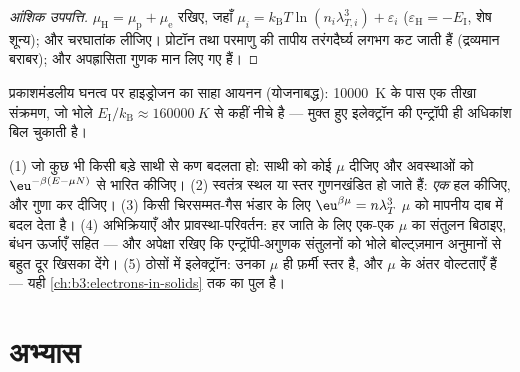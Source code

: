 \begin{proof}[आंशिक उपपत्ति]
$\mu_{\text{H}} = \mu_{\text{p}} + \mu_{\text{e}}$ रखिए, जहाँ $\mu_i
= k_{\text{B}}T\ln(n_i\lambda_{T,i}^3) + \varepsilon_i$
($\varepsilon_{\text{H}} = -E_{\text{I}}$, शेष शून्य); और
चरघातांक लीजिए। प्रोटॉन तथा परमाणु की तापीय तरंगदैर्घ्य लगभग
कट जाती हैं (द्रव्यमान बराबर); और अपह्रासिता गुणक मान लिए गए हैं।
\end{proof}

\begin{omfigure}

{\small प्रकाशमंडलीय घनत्व पर हाइड्रोजन का साहा आयनन
(योजनाबद्ध): \qty{10000}{K} के पास एक तीखा संक्रमण, जो भोले
$E_{\text{I}}/k_{\text{B}} \approx \qty{160000}{K}$ से कहीं नीचे है
--- मुक्त हुए इलेक्ट्रॉन की एन्ट्रॉपी ही अधिकांश बिल चुकाती है।}
\end{omfigure}

\begin{method}[वृहत्-विहित कारीगरी]\label{met:b3:grand-canonical:method}
(1) जो कुछ भी किसी बड़े साथी से कण बदलता हो: साथी को कोई $\mu$ दीजिए
और अवस्थाओं को $\eu^{-\beta(E - \mu N)}$ से भारित कीजिए।
(2) स्वतंत्र स्थल या स्तर गुणनखंडित हो जाते हैं: \emph{एक} हल कीजिए,
और गुणा कर दीजिए। (3) किसी चिरसम्मत-गैस भंडार के लिए $\eu^{\beta\mu} =
n\lambda_T^3$ $\mu$ को मापनीय दाब में बदल देता है। (4) अभिक्रियाएँ
और प्रावस्था-परिवर्तन: हर जाति के लिए एक-एक $\mu$ का संतुलन बिठाइए,
बंधन ऊर्जाएँ सहित --- और अपेक्षा रखिए कि एन्ट्रॉपी-अगुणक संतुलनों को
भोले बोल्ट्ज़मान अनुमानों से बहुत दूर खिसका देंगे। (5) ठोसों में
इलेक्ट्रॉन: उनका $\mu$ ही फ़र्मी स्तर है, और $\mu$ के अंतर
वोल्टताएँ हैं --- यही \cref{ch:b3:electrons-in-solids} तक का पुल है।
\end{method}

\section{अभ्यास}

